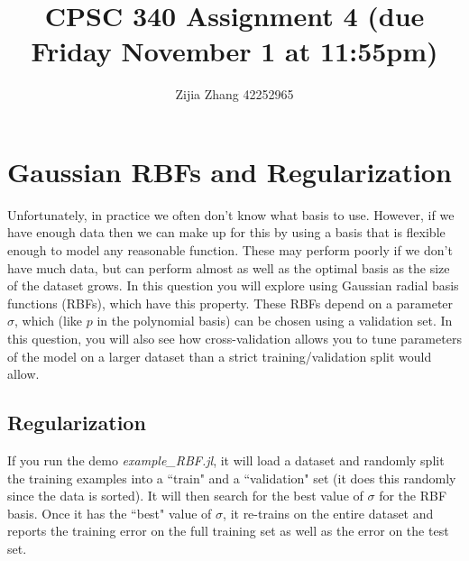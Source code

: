 \documentclass{article}
\begin{document}
\title{CPSC 340 Assignment 4  (due Friday November 1 at 11:55pm)}
\author{Zijia Zhang 42252965}
\date{}
\maketitle
\vspace{-2em}



\section{Gaussian RBFs and Regularization}

Unfortunately, in practice we often don't know what basis to use. However, if we have enough data then we can make up for this by using a basis that is flexible enough to model any reasonable function. These may perform poorly if we don't have much data, but can perform almost as well as the optimal basis as the size of the dataset grows. In this question you will explore using Gaussian radial basis functions (RBFs), which have this property. These RBFs depend on a parameter $\sigma$, which (like $p$ in the polynomial basis) can be chosen using a validation set. In this question, you will also see how cross-validation allows you to tune parameters of the model on a larger dataset than a strict training/validation split would allow.

\subsection{Regularization}

If you run the demo \emph{example\_RBF.jl}, it will load a dataset and randomly split the training examples into a ``train" and a ``validation" set (it does this randomly since the data is sorted). It will then search for the best value of $\sigma$ for the RBF basis. Once it has the ``best" value of $\sigma$, it re-trains on the entire dataset and reports the training error on the full training set as well as the error on the test set.
\end{document}
